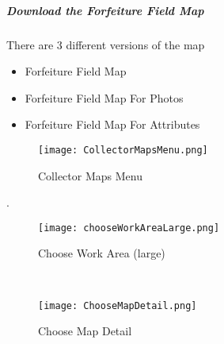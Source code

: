   \vspace{.25in}

 \vspace{2in}

  \vspace{1in}


  \clearpage
  \subparagraph[Download the Forfeiture Field Map]{Download the Forfeiture Field Map \texorpdfstring{\\}{}}
  \noindent There are 3 different versions of the map
  \vspace{.05in}

  \begin{itemize}
  \item Forfeiture Field Map
  \item Forfeiture Field Map For Photos
  \item Forfeiture Field Map For Attributes
  \end{itemize}

  \begin{wrapfigure}{r}{0.6\textwidth}
  \centering
      \texttt{[image: CollectorMapsMenu.png]}
  \caption{Collector Maps Menu}
  \end{wrapfigure}
 .
  \vspace{.5in}

  \vspace{1.75in}


  \begin{flushright}
\lookArrow
\end{flushright}
  \clearpage
  \begin{wrapfigure}{r}{0.6\textwidth}
  \centering
      \texttt{[image: chooseWorkAreaLarge.png]}
  \caption{Choose Work Area (large)}
  
  \HRule \\[.4cm] %
  \vspace{.1in}

      \texttt{[image: ChooseMapDetail.png]}
  \caption{Choose Map Detail}
  \vspace{-.1in}

  \end{wrapfigure}

